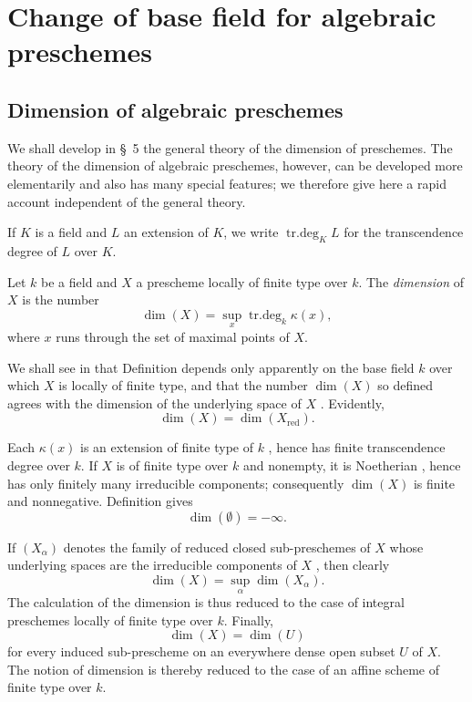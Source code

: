 \section{Change of base field for algebraic preschemes}
\label{section:IV.4}


\subsection{Dimension of algebraic preschemes}
\label{subsection:IV.4.1}

We shall develop in \S~5 the general theory of the dimension of preschemes.
The theory of the dimension of algebraic preschemes, however, can be developed more elementarily and also has many special features; we therefore give here a rapid account independent of the general theory.

If $K$ is a field and $L$ an extension of $K$, we write $\operatorname{tr.deg}_K L$ for the transcendence degree of $L$ over $K$.

\begin{definition}[4.1.1]
\label{IV.4.1.1}
Let $k$ be a field and $X$ a prescheme locally of finite type over $k$.
The \emph{dimension} of $X$ is the number
\begin{equation}
\dim(X)=\sup_x\operatorname{tr.deg}_k\kappa(x),
\tag{4.1.1.1}
\label{IV.4.1.1.1}
\end{equation}
where $x$ runs through the set of maximal points of $X$.
\end{definition}

We shall see in  that Definition  depends only apparently on the base field $k$ over which $X$ is locally of finite type, and that the number $\dim(X)$ so defined agrees with the dimension of the underlying space of $X$ .
Evidently,
\[
\dim(X)=\dim(X_{\mathrm{red}}).
\]

Each $\kappa(x)$ is an extension of finite type of $k$ , hence has finite transcendence degree over $k$.
If $X$ is of finite type over $k$ and nonempty, it is Noetherian , hence has only finitely many irreducible components; consequently $\dim(X)$ is finite and nonnegative.
Definition  gives
\[
\dim(\emptyset)=-\infty.
\]

If $(X_\alpha)$ denotes the family of reduced closed sub-preschemes of $X$ whose underlying spaces are the irreducible components of $X$ , then clearly
\begin{equation}
\dim(X)=\sup_\alpha\dim(X_\alpha).
\tag{4.1.1.2}
\label{IV.4.1.1.2}
\end{equation}
The calculation of the dimension is thus reduced to the case of integral preschemes locally of finite type over $k$.
Finally,
\begin{equation}
\dim(X)=\dim(U)
\tag{4.1.1.3}
\label{IV.4.1.1.3}
\end{equation}
for every induced sub-prescheme on an everywhere dense open subset $U$ of $X$.
The notion of dimension is thereby reduced to the case of an affine scheme of finite type over $k$.


